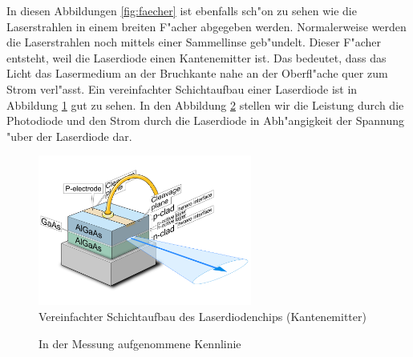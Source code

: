 \begin{refsection}
In diesen Abbildungen \ref{fig:faecher} ist ebenfalls sch"on zu sehen wie die 
Laserstrahlen in einem breiten F"acher abgegeben werden. Normalerweise werden 
die Laserstrahlen noch mittels einer Sammellinse geb"undelt. Dieser F"acher 
entsteht, weil die Laserdiode einen Kantenemitter ist. Das bedeutet, dass das 
Licht das Lasermedium an der Bruchkante nahe an der Oberfl"ache quer zum Strom 
verl"asst. Ein vereinfachter Schichtaufbau einer Laserdiode ist in 
Abbildung \ref{Laserdiodeaufbau} gut zu sehen. In den Abbildung 
\ref{fig:kennlinie} stellen wir die Leistung durch die Photodiode und den 
Strom durch die Laserdiode in Abh"angigkeit der Spannung "uber der Laserdiode 
dar. 
\begin{figure}
\centering
\includegraphics[width = 7cm]{laser/bilder/Diodenaufbau.pdf}
\caption{Vereinfachter Schichtaufbau des Laserdiodenchips (Kantenemitter)
\cite{WikiDiode}}
\label{Laserdiodeaufbau}
\end{figure}

\begin{figure}
\centering
{}\hfill
{}
\caption{In der Messung aufgenommene Kennlinie}
\label{fig:kennlinie}
\end{figure}


\end{refsection}
